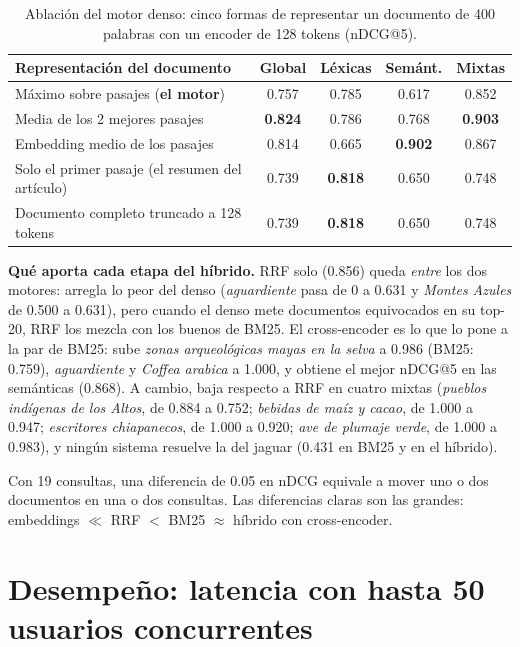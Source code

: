\documentclass[11pt,letterpaper]{article}
\begin{document}
\begin{table}[H]
\centering
\caption{Ablación del motor denso: cinco formas de representar un documento de 400 palabras con un encoder de 128 tokens (nDCG@5).}
\label{tab:ablacion}
\begin{tabular}{lcccc}
\toprule
Representación del documento & Global & Léxicas & Semánt. & Mixtas \\
\midrule
Máximo sobre pasajes (\textbf{el motor}) & 0.757 & 0.785 & 0.617 & 0.852 \\
Media de los 2 mejores pasajes & \textbf{0.824} & 0.786 & 0.768 & \textbf{0.903} \\
Embedding medio de los pasajes & 0.814 & 0.665 & \textbf{0.902} & 0.867 \\
Solo el primer pasaje (el resumen del artículo) & 0.739 & \textbf{0.818} & 0.650 & 0.748 \\
Documento completo truncado a 128 tokens & 0.739 & \textbf{0.818} & 0.650 & 0.748 \\
\bottomrule
\end{tabular}
\end{table}

\textbf{Qué aporta cada etapa del híbrido.} RRF solo (0.856) queda \emph{entre} los dos motores: arregla lo peor del denso (\emph{aguardiente} pasa de 0 a 0.631 y \emph{Montes Azules} de 0.500 a 0.631), pero cuando el denso mete documentos equivocados en su top-20, RRF los mezcla con los buenos de BM25. El cross-encoder es lo que lo pone a la par de BM25: sube \emph{zonas arqueológicas mayas en la selva} a 0.986 (BM25: 0.759), \emph{aguardiente} y \emph{Coffea arabica} a 1.000, y obtiene el mejor nDCG@5 en las semánticas (0.868). A cambio, baja respecto a RRF en cuatro mixtas (\emph{pueblos indígenas de los Altos}, de 0.884 a 0.752; \emph{bebidas de maíz y cacao}, de 1.000 a 0.947; \emph{escritores chiapanecos}, de 1.000 a 0.920; \emph{ave de plumaje verde}, de 1.000 a 0.983), y ningún sistema resuelve la del jaguar (0.431 en BM25 y en el híbrido).

Con 19 consultas, una diferencia de 0.05 en nDCG equivale a mover uno o dos documentos en una o dos consultas. Las diferencias claras son las grandes: embeddings $\ll$ RRF $<$ BM25 $\approx$ híbrido con cross-encoder.

\section{Desempeño: latencia con hasta 50 usuarios concurrentes}
\label{sec:carga}
\end{document}
